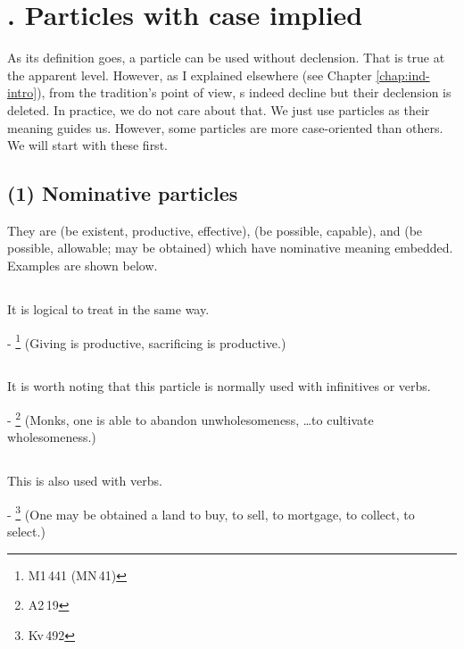 \setcounter{nipgrp}{0}
\label{nipgrp1}
\section*{. Particles with case implied}

As its definition goes, a particle can be used without declension. That is true at the apparent level. However, as I explained elsewhere (see Chapter \ref{chap:ind-intro}), from the tradition's point of view, s indeed decline but their declension is deleted. In practice, we do not care about that. We just use particles as their meaning guides us. However, some particles are more case-oriented than others. We will start with these first.

\subsection*{(1) Nominative particles}

They are  (be existent, productive, effective),  (be possible, capable), and  (be possible, allowable; may be obtained) which have nominative meaning embedded. Examples are shown below.

\subsection*{}\label{nip:atthi}
It is logical to treat  in the same way.\par
- \footnote{M1\,441 (MN\,41)} (Giving is productive, sacrificing is productive.) \par

\subsection*{}\label{nip:sakkaa}
It is worth noting that this particle is normally used with infinitives or  verbs.\par
- \footnote{A2\,19} (Monks, one is able to abandon unwholesomeness, \ldots to cultivate wholesomeness.) \par

\subsection*{}\label{nip:labbhaa}
This is also used with  verbs.\par
- \footnote{Kv\,492} (One may be obtained a land to buy, to sell, to mortgage, to collect, to select.) \par

